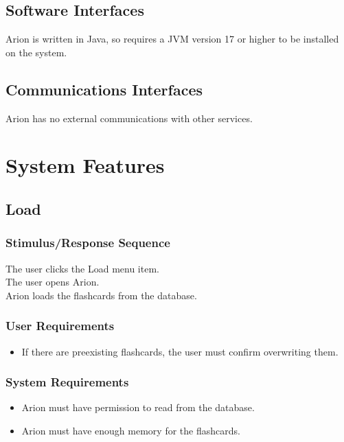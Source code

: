 \documentclass{scrreprt}
\begin{document}
\section{Software Interfaces}
Arion is written in Java, so requires a JVM version 17 or higher to be installed on the system.

\section{Communications Interfaces}
Arion has no external communications with other services.


\chapter{System Features}

\section{Load}
    \subsection*{Stimulus/Response Sequence}
        \begin{flushleft}
             The user clicks the Load menu item. \\
             The user opens Arion. \\
             Arion loads the flashcards from the database. \\
        \end{flushleft}

    \subsection*{User Requirements}
        \begin{itemize}
            \item If there are preexisting flashcards, the user must confirm overwriting them.
        \end{itemize}

    \subsection*{System Requirements}
        \begin{itemize}
            \item Arion must have permission to read from the database.
            \item Arion must have enough memory for the flashcards.
        \end{itemize}
\end{document}
